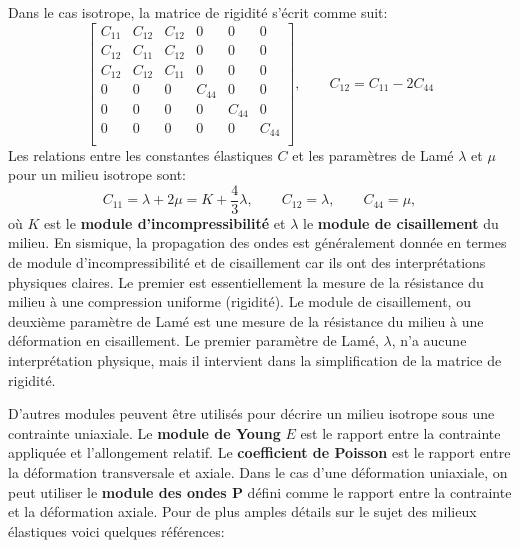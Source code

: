 Dans le cas isotrope, la matrice de rigidité s’écrit comme suit:
\[
    \begin{bmatrix}
        C_{11} & C_{12} & C_{12} &   0    &   0    &    0   \\
        C_{12} & C_{11} & C_{12} &   0    &   0    &    0   \\
        C_{12} & C_{12} & C_{11} &   0    &   0    &    0   \\
           0   &   0    &   0    & C_{44} &   0    &    0   \\
           0   &   0    &   0    &   0    & C_{44} &    0   \\
           0   &   0    &   0    &   0    &   0    & C_{44} \\
    \end{bmatrix}
, \qquad C_{12} = C_{11} - 2C_{44}
\]
Les relations entre les constantes élastiques $C$  et les paramètres de Lamé
$\lambda$ et $\mu$ pour un milieu isotrope sont:
\begin{equation}
C_{11} = \lambda + 2\mu = K + \frac{4}{3}\lambda, \qquad C_{12} = \lambda,
\qquad C_{44}= \mu,
\end{equation}
où $K$ est le \textbf{module d'incompressibilité} et $\lambda$ le \textbf{module
de cisaillement} du milieu.
En sismique, la propagation des ondes est généralement donnée en termes de module
d'incompressibilité et de cisaillement car ils ont des interprétations physiques
claires. Le premier est essentiellement la mesure de la résistance du milieu à
une compression uniforme (rigidité). Le module de cisaillement, ou deuxième
paramètre de Lamé est une mesure de la résistance du milieu à une déformation en
cisaillement. Le premier paramètre de Lamé, $\lambda$, n'a aucune interprétation
physique, mais il intervient dans la simplification de la matrice de rigidité.\par
D'autres modules peuvent être utilisés pour décrire un milieu isotrope sous une
contrainte uniaxiale. Le \textbf{module de Young} $E$ est le rapport entre la
contrainte appliquée et l'allongement relatif. Le \textbf{coefficient de
Poisson} est le rapport entre la déformation transversale et axiale. Dans le cas
d'une déformation uniaxiale, on peut utiliser le \textbf{module des ondes P}
défini comme le rapport entre la contrainte et la déformation axiale. Pour de
plus amples détails sur le sujet des milieux élastiques voici quelques
références: \citet{Bourbie1986,Carcione2007,Mavko2009}
